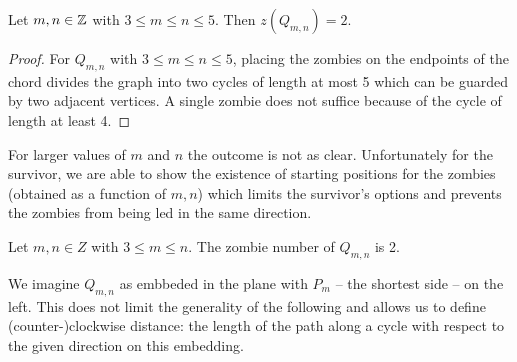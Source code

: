 \begin{lemma}
Let $m,n \in \mathbb{Z}$ with $3 \leq m \leq n \leq 5$. Then $z(Q_{m,n}) = 2$.
\end{lemma}
\begin{proof}
   For $Q_{m,n}$ with $3 \leq m \leq n \leq 5$, placing the zombies on the endpoints
  of the chord divides the graph into two cycles of length at most 5 which can be guarded by two adjacent vertices. A single zombie does not suffice because of the cycle of length at least 4.
\end{proof}

For larger values of $m$ and $n$ the outcome is not as clear. Unfortunately for the survivor, we are able to show the existence of starting positions for the zombies (obtained as a function of $m, n$) which limits the survivor's options and prevents the zombies from being led in the same direction.

\begin{theorem}
 Let $m, n \in Z$ with $3 \leq m \leq n$. The zombie number of $Q_{m,n}$ is 2.
\end{theorem}

We imagine $Q_{m,n}$ as embbeded in the plane with $P_m$
-- the shortest side -- on the left.
This does not limit the generality of the following and allows us to define
(counter-)clockwise distance: the length of the path
along a cycle with respect to the given direction on this embedding.


